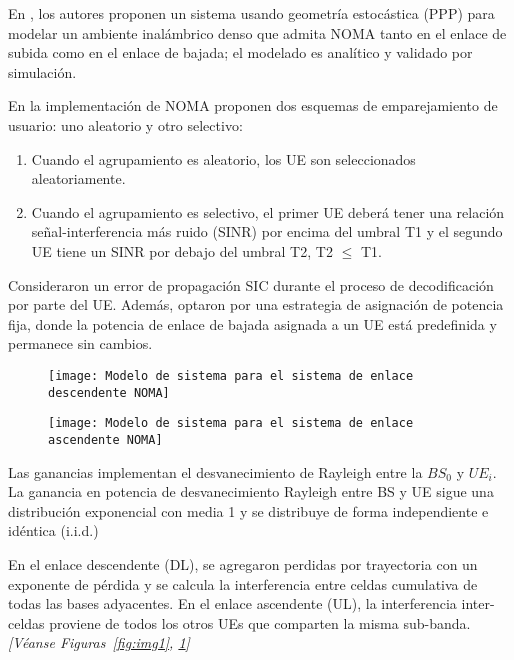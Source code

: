 En \parencite{Zhang2017}, los autores proponen un sistema usando geometría estocástica (PPP) para modelar un ambiente inalámbrico denso que admita NOMA tanto en el enlace de subida como en el enlace de bajada; el modelado es analítico y validado por simulación. \newline

En la implementación de NOMA proponen dos esquemas de emparejamiento de usuario: uno aleatorio y otro selectivo:
\begin{enumerate}
\item  Cuando el agrupamiento es aleatorio, los UE son seleccionados aleatoriamente.
\item  Cuando el agrupamiento es selectivo, el primer UE deberá tener una relación señal-interferencia más ruido (SINR) por encima del umbral T1 y el segundo UE tiene un SINR por debajo del umbral T2, T2 $\mathrm{\le}$ T1.
\end{enumerate}

Consideraron un error de propagación SIC durante el proceso de decodificación por parte del UE. Además, optaron por una estrategia de asignación de potencia fija, donde la potencia de enlace de bajada asignada a un UE está predefinida y permanece sin cambios.\newline

\begin{figure}
\centering
\begin{minipage}{.45\linewidth}
  \texttt{[image: Modelo de sistema para el sistema de enlace descendente NOMA]}
  \label{fig:img1}
\end{minipage}
\hspace{.05\linewidth}
\begin{minipage}{.45\linewidth}
  \texttt{[image: Modelo de sistema para el sistema de enlace ascendente NOMA]}
  \label{fig:img2}
\end{minipage}
\end{figure}

Las ganancias implementan el desvanecimiento de Rayleigh entre la $BS_0$ y $UE_i$. La ganancia en potencia de desvanecimiento Rayleigh entre BS y UE sigue una distribución exponencial con media 1 y se distribuye de forma independiente e idéntica (i.i.d.)\newline

En el enlace descendente (DL), se agregaron perdidas por trayectoria con un exponente de pérdida y se calcula la interferencia entre celdas cumulativa de todas las bases adyacentes. En el enlace ascendente (UL), la interferencia inter-celdas proviene de todos los otros UEs que comparten la misma sub-banda. \textit{[Véanse Figuras~\ref{fig:img1}, \ref{fig:img2}]}\newline

